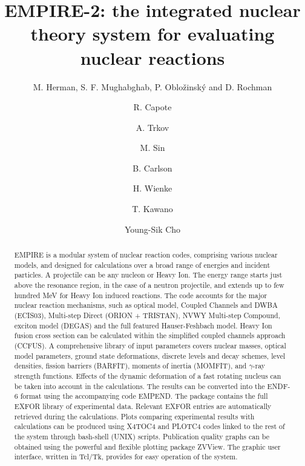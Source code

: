 \documentclass[twocolumn,amsmath,amssymb,10pt,groupedaddress,a4paper]{revtex4}
\begin{document}
\title{EMPIRE-2: the integrated nuclear theory system for evaluating nuclear reactions}


\author{M. Herman, S. F. Mughabghab, P. Oblo\v zinsk\'y and D. Rochman}
\author{R. Capote}
\author{A. Trkov }
\author{M. Sin}
\author{B. Carlson}
\author{H. Wienke}
\author{T. Kawano}
\author{Young-Sik Cho}

\begin{abstract}

EMPIRE is a modular system of nuclear reaction codes, comprising various
nuclear models, and designed for calculations over a broad range of
energies and incident particles. A projectile can be any nucleon or
Heavy Ion. The energy range starts just above the resonance region,
in the case of a neutron projectile, and extends up to few hundred
MeV for Heavy Ion induced reactions. The code accounts for the major
nuclear reaction mechanisms, such as optical model, Coupled Channels
and DWBA (ECIS03), Multi-step Direct (ORION + TRISTAN), NVWY Multi-step
Compound, exciton model (DEGAS) and the full featured Hauser-Feshbach
model. Heavy Ion fusion cross section can be calculated within the
simplified coupled channels approach (CCFUS). A comprehensive library
of input parameters covers nuclear masses, optical model parameters,
ground state deformations, discrete levels and decay schemes, level
densities, fission barriers (BARFIT), moments of inertia (MOMFIT),
and $\gamma$-ray strength functions. Effects of the dynamic deformation
of a fast rotating nucleus can be taken into account in the calculations.
The results can be converted into the ENDF-6 format using the accompanying
code EMPEND. The package contains the full EXFOR library of experimental
data. Relevant EXFOR entries are automatically retrieved during the
calculations. Plots comparing experimental results with calculations
can be produced using X4TOC4 and PLOTC4 codes linked to the rest of
the system through bash-shell (UNIX) scripts. Publication quality
graphs can be obtained using the powerful and flexible plotting package
ZVView. The graphic user interface, written in Tcl/Tk, provides for
easy operation of the system.

\end{abstract}
\end{document}
